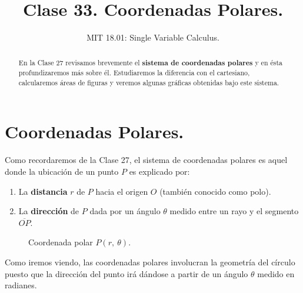 \documentclass[12pt]{article}
\title{Clase 33. Coordenadas Polares.}
\author{MIT 18.01: Single Variable Calculus.}
\date{}
\begin{document}
\maketitle

\begin{abstract}
\noindent En la Clase 27 revisamos brevemente el \textbf{sistema de coordenadas polares} y en ésta profundizaremos más sobre él. Estudiaremos la diferencia con el cartesiano, calcularemos áreas de figuras y veremos algunas gráficas obtenidas bajo este sistema.
\end{abstract}


\section{Coordenadas Polares.}

Como recordaremos de la Clase 27, el sistema de coordenadas polares es aquel donde la ubicación de un punto $P$ es explicado por:

\begin{enumerate}
\item La \textbf{distancia} $r$ de $P$ hacia el origen $O$ (también conocido como polo).
\item La \textbf{dirección} de $P$ dada por un ángulo $\theta$ medido entre un rayo y el segmento $\overline{OP}$.
\end{enumerate}

\begin{figure}[hbt!]
\centering


\caption{Coordenada polar $P(r, \ \theta)$.}
\end{figure}

Como iremos viendo, las coordenadas polares involucran la geometría del círculo puesto que la dirección del punto irá dándose a partir de un ángulo $\theta$ medido en radianes.
\end{document}
